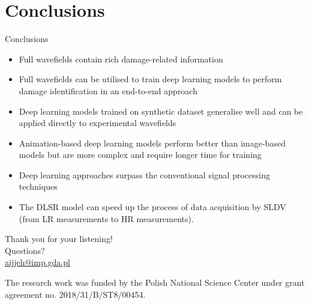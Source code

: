 \documentclass[10pt,aspectratio=169,dvipsnames]{beamer} %
\begin{document}
	\section{Conclusions}
	\begin{frame}{Conclusions}
		\footnotesize
		\begin{itemize}
			\item Full wavefields contain rich damage-related information
			\item Full wavefields can be utilised to train deep learning models to perform damage identification in an end-to-end approach
			\item Deep learning models trained on synthetic dataset generalise well and can be applied directly to experimental wavefields
			\item Animation-based deep learning models perform better than image-based models but are more complex and require longer time for training
			\item Deep learning approaches surpass the conventional signal processing techniques
			\item The DLSR model can speed up the process of data acquisition by SLDV (from LR measurements to HR measurements).
		\end{itemize}
	\end{frame}		
	{
		\begin{frame}[standout]
			Thank you for your listening!\\ \vspace{12pt}
			Questions?\\ \vspace{12pt}
			\url{aijjeh@imp.gda.pl}
			
			
			\par\medskip
			\par\medskip
			\footnotesize
			The research work was funded by the Polish National Science Center under grant agreement no. 2018/31/B/ST8/00454.
		\end{frame}}
\end{document}
